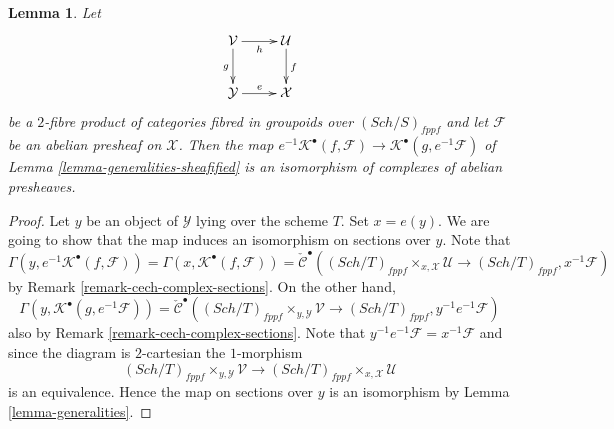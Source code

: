 \documentclass[10pt,a4paper]{amsart}
\theoremstyle{plain}
\newtheorem{lemma}[subsection]{Lemma}
\theoremstyle{definition}
\theoremstyle{remark}
\numberwithin{equation}{subsection}
\def\Sch{\mathit{Sch}}
\begin{document}
\begin{lemma}
\label{lemma-base-change-cech-complex}
Let
$$
\xymatrix{
\mathcal{V} \ar[d]_g \ar[r]_h & \mathcal{U} \ar[d]^f \\
\mathcal{Y} \ar[r]^e & \mathcal{X}
}
$$
be a $2$-fibre product of categories fibred in groupoids over
$(\Sch/S)_{fppf}$ and let $\mathcal{F}$ be an abelian presheaf
on $\mathcal{X}$. Then the map
$e^{-1}\mathcal{K}^\bullet(f, \mathcal{F}) \to
\mathcal{K}^\bullet(g, e^{-1}\mathcal{F})$
of
Lemma \ref{lemma-generalities-sheafified}
is an isomorphism of complexes of abelian presheaves.
\end{lemma}

\begin{proof}
Let $y$ be an object of $\mathcal{Y}$ lying over the scheme $T$.
Set $x = e(y)$. We are going to show that the map induces an isomorphism
on sections over $y$. Note that
$$
\Gamma(y, e^{-1}\mathcal{K}^\bullet(f, \mathcal{F})) =
\Gamma(x, \mathcal{K}^\bullet(f, \mathcal{F})) =
\check{\mathcal{C}}^\bullet(
(\Sch/T)_{fppf} \times_{x, \mathcal{X}} \mathcal{U} \to
(\Sch/T)_{fppf}, x^{-1}\mathcal{F})
$$
by
Remark \ref{remark-cech-complex-sections}. On the other hand,
$$
\Gamma(y, \mathcal{K}^\bullet(g, e^{-1}\mathcal{F})) =
\check{\mathcal{C}}^\bullet(
(\Sch/T)_{fppf} \times_{y, \mathcal{Y}} \mathcal{V} \to
(\Sch/T)_{fppf}, y^{-1}e^{-1}\mathcal{F})
$$
also by
Remark \ref{remark-cech-complex-sections}.
Note that $y^{-1}e^{-1}\mathcal{F} = x^{-1}\mathcal{F}$
and since the diagram is $2$-cartesian the $1$-morphism
$$
(\Sch/T)_{fppf} \times_{y, \mathcal{Y}} \mathcal{V} \to
(\Sch/T)_{fppf} \times_{x, \mathcal{X}} \mathcal{U}
$$
is an equivalence. Hence the map on sections over $y$ is an
isomorphism by
Lemma \ref{lemma-generalities}.
\end{proof}
\end{document}
